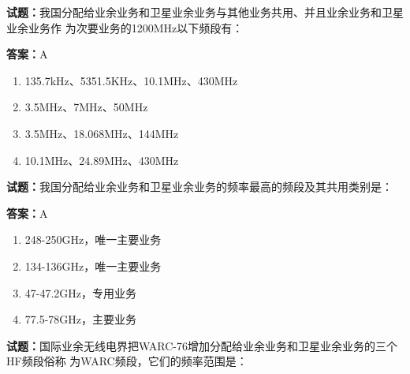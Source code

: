\documentclass{ctexbook}
\begin{document}




\vspace{1em}

\textbf{试题：}我国分配给业余业务和卫星业余业务与其他业务共用、并且业余业务和卫星业余业务作
为次要业务的1200MHz以下频段有： 

\textbf{答案：}A 

\begin{enumerate}[leftmargin=3em]
  \item 135.7kHz、5351.5KHz、10.1MHz、430MHz 

  \item 3.5MHz、7MHz、50MHz 

  \item 3.5MHz、18.068MHz、144MHz 

  \item 10.1MHz、24.89MHz、430MHz 

\end{enumerate}





\vspace{1em}

\textbf{试题：}我国分配给业余业务和卫星业余业务的频率最高的频段及其共用类别是： 

\textbf{答案：}A 

\begin{enumerate}[leftmargin=3em]
  \item 248-250GHz，唯一主要业务 

  \item 134-136GHz，唯一主要业务 

  \item 47-47.2GHz，专用业务 

  \item 77.5-78GHz，主要业务 

\end{enumerate}





\vspace{1em}

\textbf{试题：}国际业余无线电界把WARC-76增加分配给业余业务和卫星业余业务的三个HF频段俗称
为WARC频段，它们的频率范围是： 
\end{document}
